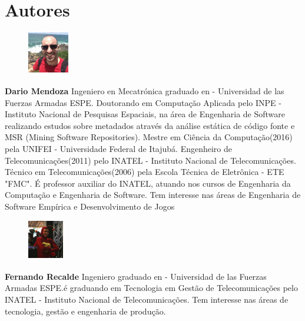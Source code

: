 \section*{Autores}
\setcounter{contador}{0}

\begin{figure}
\includegraphics[trim= 0 2 0 0,clip,width=0.16\textwidth]{figuras/autor1.jpg}
\end{figure}

    \textbf{Dario Mendoza\textsuperscript{\contAutor}} Ingeniero en Mecatrónica graduado en - Universidad de las Fuerzas Armadas ESPE. Doutorando em Computação Aplicada pelo INPE - Instituto Nacional de Pesquisas Espaciais, na área de Engenharia de Software realizando estudos sobre metadados através da análise estática de código fonte e MSR (Mining Software Repositories). Mestre em Ciência da Computação(2016) pela UNIFEI - Universidade Federal de Itajubá. Engenheiro de Telecomunicações(2011) pelo INATEL - Instituto Nacional de Telecomunicações.  Técnico em Telecomunicações(2006) pela Escola Técnica de Eletrônica - ETE "FMC". É professor auxiliar do INATEL, atuando nos cursos de Engenharia da Computação e Engenharia de Software. Tem interesse nas áreas de Engenharia de Software Empírica e Desenvolvimento de Jogos\newline
    
\begin{figure}
\includegraphics[trim= 0 2 0 0,clip,width=0.14\textwidth]{figuras/autor2.png}  
\end{figure}

   \textbf{Fernando Recalde\textsuperscript{\contAutor}} Ingeniero  graduado en - Universidad de las Fuerzas Armadas ESPE.é graduando em Tecnologia em Gestão de Telecomunicações pelo INATEL - Instituto Nacional de Telecomunicações. Tem interesse nas áreas de tecnologia, gestão e engenharia de produção.\newline

